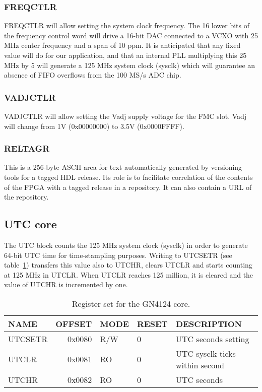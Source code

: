 \documentclass{article}
\begin{document}
\subsubsection{FREQCTLR}
FREQCTLR will allow setting the system clock frequency. The 16 lower bits of the frequency control word will drive a 16-bit DAC connected to a VCXO with 25 MHz center frequency and a span of 10 ppm. It is anticipated that any fixed value will do for our application, and that an internal PLL multiplying this 25 MHz by 5 will generate a 125 MHz system clock (sysclk) which will guarantee an absence of FIFO overflows from the 100 MS/s ADC chip.

\subsubsection{VADJCTLR}
VADJCTLR will allow setting the Vadj supply voltage for the FMC slot. Vadj will change from 1V (0x00000000) to 3.5V (0x0000FFFF). 

\subsubsection{RELTAGR}
This is a 256-byte ASCII area for text automatically generated by versioning tools for a tagged HDL release. Its role is to facilitate correlation of the contents of the FPGA with a tagged release in a repository. It can also contain a URL of the repository.

\subsection{UTC core}
The UTC block counts the 125 MHz system clock (sysclk) in order to generate 64-bit UTC time for time-stampling purposes. Writing to UTCSETR (see table~\ref{tab:utc_core}) transfers this value also to UTCHR, clears UTCLR and starts counting at 125 MHz in UTCLR. When UTCLR reaches 125 million, it is cleared and the value of UTCHR is incremented by one.

\begin{table}[htbp]
  \centering
  \begin{tabularx}{\textwidth}{|l|r|l|l|X|}
    \hline
    \textbf{NAME} & \textbf{OFFSET} & \textbf{MODE} & \textbf{RESET} & \textbf{DESCRIPTION} \\
    \hline
    \hline
    UTCSETR & 0x0080 & R/W & 0 & UTC seconds setting\\
    \hline
    UTCLR & 0x0081 & RO & 0 & UTC sysclk ticks within second\\
    \hline
    UTCHR & 0x0082 & RO & 0 & UTC seconds\\
    \hline
  \end{tabularx}
  \caption{Register set for the GN4124 core.}
  \label{tab:utc_core}
\end{table}
\end{document}

